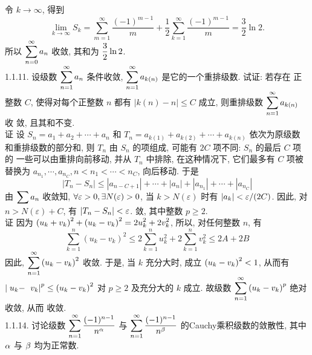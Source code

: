 \documentclass[a4paper,11pt,UTF8]{article}
\begin{document}
令 $k \rightarrow \infty$, 得到
$$
\lim _{k \rightarrow \infty} S_k=\sum_{m=1}^{\infty} \frac{(-1)^{m-1}}{m}+\frac{1}{2} \sum_{k=1}^{\infty} \frac{(-1)^{m-1}}{m}=\frac{3}{2} \ln 2 .
$$
所以 $\displaystyle \displaystyle \displaystyle \sum_{n=0}^{\infty} a_n$ 收敛, 其和为 $\displaystyle \displaystyle \displaystyle \frac{3}{2} \ln 2$.\\
1.1.11. 设级数 $\displaystyle \displaystyle \displaystyle \sum_{n=1}^{\infty} a_n$ 条件收敛, $\displaystyle \displaystyle \displaystyle \sum_{n=1}^{\infty} a_{k(n)}$ 是它的一个重排级数. 试证: 若存在 正整数 $C$, 使得对每个正整数 $n$ 都有 $|k(n)-n| \leq C$ 成立, 则重排级数 $\displaystyle \displaystyle \displaystyle \sum_{n=1}^{\infty} a_{k(n)}$ 收 敛, 且其和不变.\\
证 设 $S_n=a_1+a_2+\cdots+a_n$ 和 $T_n=a_{k(1)}+a_{k(2)}+\cdots+a_{k(n)}$ 依次为原级数 和重排级数的部分和, 则 $T_n$ 由 $S_n$ 的项组成, 可能有 $2 C$ 项不同: $S_n$ 的最后 $C$ 项的 一些可以由重排向前移动, 并从 $T_n$ 中排除, 在这种情况下, 它们最多有 $C$ 项被 替换为 $a_{n_1}, \cdots, a_{n_C}, n<n_1<\cdots<n_C$, 向后移动. 于是
$$
\left|T_n-S_n\right| \leq\left|a_{n-C+1}\right|+\cdots+\left|a_n\right|+\left|a_{n_1}\right|+\cdots+\left|a_{n_C}\right|
$$
由 $\displaystyle \displaystyle \displaystyle \sum a_n$ 收敛知, $\displaystyle \displaystyle \displaystyle \forall \varepsilon>0, \exists N(\varepsilon)>0$, 当 $k>N(\varepsilon)$ 时有 $\displaystyle \displaystyle \displaystyle \left|a_k\right|<\varepsilon /(2 C)$. 因此, 对 $n>N(\varepsilon)+C$, 有 $\displaystyle \displaystyle \displaystyle \left|T_n-S_n\right|<\varepsilon$.
敛, 其中整数 $p \geq 2$.\\
证 因为 $\displaystyle \displaystyle \displaystyle \left(u_k+v_k\right)^2+\left(u_k-v_k\right)^2=2 u_k^2+2 v_k^2$, 所以, 对任何整数 $n$, 有
$$
\sum_{k=1}^n\left(u_k-v_k\right)^2 \leq 2 \sum_{k=1}^n u_k^2+2 \sum_{k=1}^n v_k^2 \leq 2 A+2 B
$$
因此, $\displaystyle \displaystyle \displaystyle \sum_{n=1}^{\infty}\left(u_k-v_k\right)^2$ 收敛. 于是, 当 $k$ 充分大时, 成立 $\displaystyle \displaystyle \displaystyle \left(u_k-v_k\right)^2<1$, 从而有 $\displaystyle \displaystyle \displaystyle \mid u_k-$ $\displaystyle \displaystyle \displaystyle \left.v_k\right|^p \leq\left(u_k-v_k\right)^2$ 对 $p \geq 2$ 及充分大的 $k$ 成立. 故级数 $\displaystyle \displaystyle \displaystyle \sum_{n=1}^{\infty}\left(u_k-v_k\right)^p$ 绝对收敛, 从而 收敛.\\
1.1.14. 讨论级数 $\displaystyle \displaystyle \displaystyle \sum_{n=1}^{\infty} \frac{(-1)^{n-1}}{n^\alpha}$ 与 $\displaystyle \displaystyle \displaystyle \sum_{n=1}^{\infty} \frac{(-1)^{n-1}}{n^\beta}$ 的Cauchy乘积级数的敛散性, 其中 $\displaystyle \displaystyle \displaystyle \alpha$ 与 $\displaystyle \displaystyle \displaystyle \beta$ 均为正常数.\\
\end{document}
